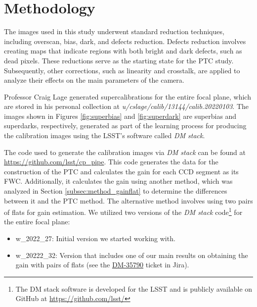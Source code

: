 \section{Methodology} \label{sec:methods}

The images used in this study underwent standard reduction techniques, including overscan, bias, dark, and defects reduction. Defects reduction involves creating maps that indicate regions with both bright and dark defects, such as dead pixels. These reductions serve as the starting state for the PTC study. Subsequently, other corrections, such as linearity and crosstalk, are applied to analyze their effects on the main parameters of the camera.

\vspace{3mm}
Professor Craig Lage generated supercalibrations for the entire focal plane, which are stored in his personal collection at \textit{u/cslage/calib/13144/calib.20220103}. The images shown in Figures \ref{fig:superbias} and \ref{fig:superdark} are superbias and superdarks, respectively, generated as part of the learning process for producing the calibration images using the LSST's software called \textit{DM stack}.

\vspace{3mm}
The code used to generate the calibration images via \textit{DM stack} can be found at \\ \href{https://github.com/lsst/cp_pipe}{https://github.com/lsst/cp\_pipe}. This code generates the data for the construction of the PTC and calculates the gain for each CCD segment as its FWC. Additionally, it calculates the gain using another method, which was analyzed in Section \ref{subsec:method_gainflat} to determine the differences between it and the PTC method. The alternative method involves using two pairs of flats for gain estimation. We utilized two versions of the \textit{DM stack} code\footnote{The DM stack software is developed for the LSST and is publicly available on GitHub at \href{https://github.com/lsst/}{https://github.com/lsst/}} for the entire focal plane:

\begin{itemize}
    \item w\_2022\_27: Initial version we started working with.
    \item w\_20222\_32: Version that includes one of our main results on obtaining the gain with pairs of flats (see the \href{https://jira.lsstcorp.org/browse/DM-35790}{DM-35790} ticket in Jira).
\end{itemize}

